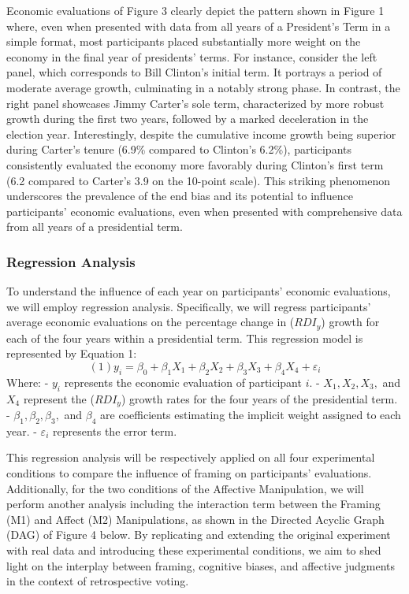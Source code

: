 \documentclass[
]{article}
\begin{document}
Economic evaluations of Figure 3 clearly depict the pattern shown in
Figure 1 where, even when presented with data from all years of a
President's Term in a simple format, most participants placed
substantially more weight on the economy in the final year of
presidents' terms. For instance, consider the left panel, which
corresponds to Bill Clinton's initial term. It portrays a period of
moderate average growth, culminating in a notably strong phase. In
contrast, the right panel showcases Jimmy Carter's sole term,
characterized by more robust growth during the first two years, followed
by a marked deceleration in the election year. Interestingly, despite
the cumulative income growth being superior during Carter's tenure
(6.9\% compared to Clinton's 6.2\%), participants consistently evaluated
the economy more favorably during Clinton's first term (6.2 compared to
Carter's 3.9 on the 10-point scale). This striking phenomenon
underscores the prevalence of the end bias and its potential to
influence participants' economic evaluations, even when presented with
comprehensive data from all years of a presidential term.

\hypertarget{regression-analysis}{%
\subsubsection{Regression Analysis}\label{regression-analysis}}

To understand the influence of each year on participants' economic
evaluations, we will employ regression analysis. Specifically, we will
regress participants' average economic evaluations on the percentage
change in (\(RDI_y\)) growth for each of the four years within a
presidential term. This regression model is represented by Equation 1:
\[
(1) y_i = \beta_0 + \beta_1 X_1 + \beta_2 X_2 + \beta_3 X_3 + \beta_4 X_4 + \varepsilon_i
\] Where: - \(y_i\) represents the economic evaluation of participant
\(i\). - \(X_1, X_2, X_3,\) and \(X_4\) represent the (\(RDI_y\)) growth
rates for the four years of the presidential term. -
\(\beta_1, \beta_2, \beta_3,\) and \(\beta_4\) are coefficients
estimating the implicit weight assigned to each year. -
\(\varepsilon_i\) represents the error term.

This regression analysis will be respectively applied on all four
experimental conditions to compare the influence of framing on
participants' evaluations. Additionally, for the two conditions of the
Affective Manipulation, we will perform another analysis including the
interaction term between the Framing (M1) and Affect (M2) Manipulations,
as shown in the Directed Acyclic Graph (DAG) of Figure 4 below. By
replicating and extending the original experiment with real data and
introducing these experimental conditions, we aim to shed light on the
interplay between framing, cognitive biases, and affective judgments in
the context of retrospective voting.
\end{document}
